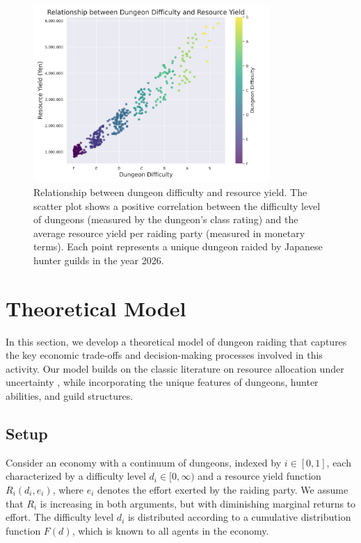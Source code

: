 \documentclass[12pt, a4paper]{article}
\begin{document}
\begin{figure}[ht]
    \centering
    \includegraphics[width=0.8\textwidth]{dungeon_difficulty_resource_yield.png}
    \caption{Relationship between dungeon difficulty and resource yield. The scatter plot shows a positive correlation between the difficulty level of dungeons (measured by the dungeon's class rating) and the average resource yield per raiding party (measured in monetary terms). Each point represents a unique dungeon raided by Japanese hunter guilds in the year 2026. }
    \label{fig:dungeon_difficulty_resource_yield}
\end{figure}

\section{Theoretical Model}
In this section, we develop a theoretical model of dungeon raiding that captures the key economic trade-offs and decision-making processes involved in this activity. Our model builds on the classic literature on resource allocation under uncertainty \citep{arrow1971theory, stiglitz1974incentives}, while incorporating the unique features of dungeons, hunter abilities, and guild structures.

\subsection{Setup}
Consider an economy with a continuum of dungeons, indexed by $i \in [0,1]$, each characterized by a difficulty level $d_i \in [0,\infty)$ and a resource yield function $R_i(d_i, e_i)$, where $e_i$ denotes the effort exerted by the raiding party. We assume that $R_i$ is increasing in both arguments, but with diminishing marginal returns to effort. The difficulty level $d_i$ is distributed according to a cumulative distribution function $F(d)$, which is known to all agents in the economy.
\end{document}
